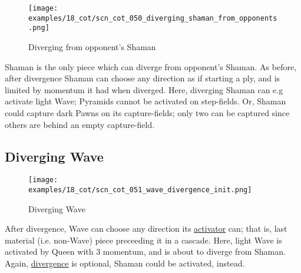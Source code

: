 \vspace*{-1.4\baselineskip}
\noindent
\begin{figure}[!h]
\texttt{[image: examples/18\_cot/scn\_cot\_050\_diverging\_shaman\_from\_opponents.png]}
\vspace*{-1.3\baselineskip}
\caption{Diverging from opponent's Shaman}
\label{fig:scn_cot_050_diverging_shaman_from_opponents}
\end{figure}

\vspace*{-0.5\baselineskip}
Shaman is the only piece which can diverge from opponent's Shaman. As before, after
divergence Shaman can choose any direction as if starting a ply, and is limited by
momentum it had when diverged. \newline
\indent
Here, diverging Shaman can e.g activate light Wave; Pyramids cannot be activated
on step-fields. Or, Shaman could capture dark Pawns on its capture-fields; only two
can be captured since others are behind an empty capture-field.

\clearpage %

\subsection*{Diverging Wave}
\label{sec:Conquest of Tlalocan/Divergence/Diverging Wave}

\vspace*{-1.4\baselineskip}
\noindent
\begin{figure}[!h]
\texttt{[image: examples/18\_cot/scn\_cot\_051\_wave\_divergence\_init.png]}
\vspace*{-1.3\baselineskip}
\caption{Diverging Wave}
\label{fig:scn_cot_051_wave_divergence_init}
\end{figure}

\vspace*{-0.4\baselineskip}
After divergence, Wave can choose any direction its
\hyperref[fig:scn_mv_30_wave_cascading_steps]{activator} can; that is, last material
(i.e. non-Wave) piece preceeding it in a cascade. \newline
\indent
Here, light Wave is activated by Queen with 3 momentum, and is about to diverge from
Shaman. \newline
\indent
Again, \hyperref[fig:scn_cot_030_own_shaman_is_divergent_init]{divergence} is optional,
Shaman could be activated, instead.


